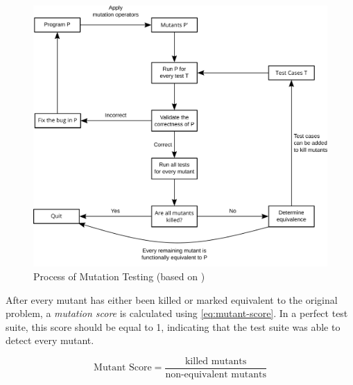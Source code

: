 \begin{figure}[htbp!]
	\centering
	\includegraphics[width=\textwidth]{assets/mutation-testing.pdf}
	\caption{Process of Mutation Testing (based on \cite{Offutt2001})}
	\label{fig:mutation-testing}
\end{figure}

\noindent After every mutant has either been killed or marked equivalent to the original problem, a \emph{mutation score} is calculated using \autoref{eq:mutant-score}. In a perfect test suite, this score should be equal to 1, indicating that the test suite was able to detect every mutant. 

\begin{equation}\label{eq:mutant-score}
	\text{Mutant Score} = \frac{\text{killed mutants}}{\text{non-equivalent mutants}}
\end{equation}


